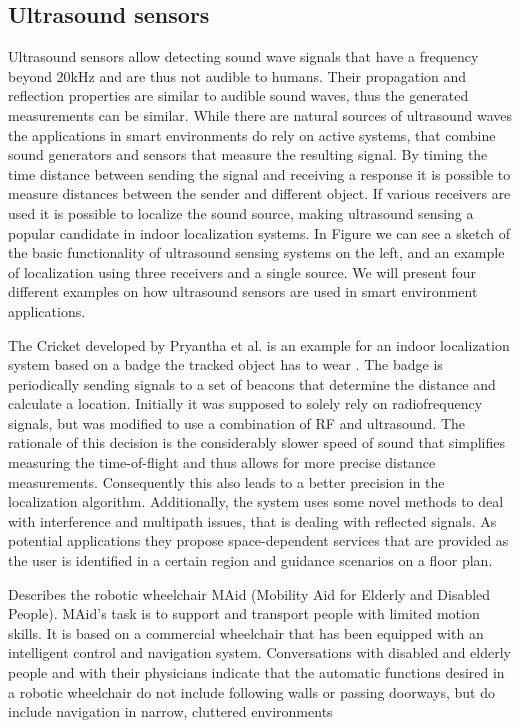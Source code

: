 \subsection{Ultrasound sensors}
Ultrasound sensors allow detecting sound wave signals that have a frequency beyond 20kHz and are thus not audible to humans. Their propagation and reflection properties are similar to audible sound waves, thus the generated measurements can be similar. While there are natural sources of ultrasound waves the applications in smart environments do rely on active systems, that combine sound generators and sensors that measure the resulting signal. By timing the time distance between sending the signal and receiving a response it is possible to measure distances between the sender and different object.  If various receivers are used it is possible to localize the sound source, making ultrasound sensing a popular candidate in indoor localization systems. In Figure we can see a sketch of the basic functionality of ultrasound sensing systems on the left, and an example of localization using three receivers and a single source. We will present four different examples on how ultrasound sensors are used in smart environment applications.

The Cricket developed by Pryantha et al. is an example for an indoor localization system based on a badge the tracked object has to wear \cite{priyantha2000cricket}. The badge is periodically sending signals to a set of beacons that determine the distance and calculate a location. Initially it was supposed to solely rely on radiofrequency signals, but was modified to use a combination of RF and ultrasound. The rationale of this decision is the considerably slower speed of sound that simplifies measuring the time-of-flight and thus allows for more precise distance measurements. Consequently this also leads to a better precision in the localization algorithm. Additionally, the system uses some novel methods to deal with interference and multipath issues, that is dealing with reflected signals. As potential applications they propose space-dependent services that are provided as the user is identified in a certain region and guidance scenarios on a floor plan.

\cite{prassler2001robotics}
Describes the robotic wheelchair MAid (Mobility Aid for Elderly and Disabled People). MAid's task is to support and transport people with limited motion skills. It is based on a commercial wheelchair that has been equipped with an intelligent control and navigation system. Conversations with disabled and elderly people and with their physicians indicate that the automatic functions desired in a robotic wheelchair do not include following walls or passing doorways, but do include navigation in narrow, cluttered environments

